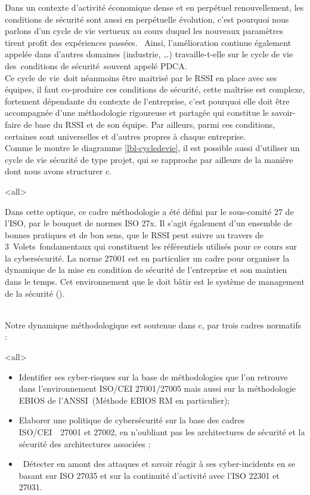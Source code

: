 Dans un contexte d'activité économique dense et en perpétuel renouvellement, les conditions de sécurité sont aussi en perpétuelle évolution, c’est pourquoi nous parlons d'un cycle de vie vertueux au cours duquel les nouveaux paramètres tirent profit des expériences passées.  Ainsi, l’amélioration continue également appelée  dans d’autres domaines (industrie, …) travaille-t-elle sur le cycle de vie des conditions de sécurité souvent appelé \gls{PDCA}.\\
Ce cycle de vie doit néanmoins être maitrisé par le RSSI en place avec ses équipes, il faut co-produire ces conditions de sécurité, cette maîtrise est complexe, fortement dépendante du contexte de l'entreprise, c’est pourquoi elle doit être accompagnée d'une méthodologie rigoureuse et partagée qui constitue le savoir-faire de base du RSSI et de son équipe. Par ailleurs, parmi ces conditions, certaines sont universelles et d’autres propres à chaque entreprise. \\ Comme le montre le diagramme \ref{lbl-cycledevie}, il est possible aussi d’utiliser un cycle de vie sécurité de type projet, qui se rapproche par ailleurs de la manière dont nous avons structurer c\edoc. 

\mode<all>{}


Dans cette optique, ce cadre méthodologie a été défini par le sous-comité 27 de l'ISO, par le bouquet de normes ISO 27x. Il s’agit également d'un ensemble de bonnes pratiques et de bon sens, que le RSSI peut suivre au travers de 3 Volets fondamentaux qui constituent les référentiels utilisés pour ce cours sur la cybersécurité. La norme 27001 est en particulier un cadre pour organiser la dynamique de la mise en condition de sécurité de l’entreprise et son maintien dans le temps. Cet environnement que le  doit bâtir est le système de management de la sécurité ().

\\
Notre dynamique méthodologique est soutenue dans  c\edoc, par trois cadres normatifs : 
 
\mode<all>{
{
\begin{itemize}
\item Identifier ses cyber-risques sur la base de méthodologies que l’on retrouve dans l’environnement ISO/CEI 27001/27005 mais aussi sur la méthodologie EBIOS de l’ANSSI (Méthode EBIOS RM en particulier); 
\item Elaborer une politique de cybersécurité sur la base des cadres ISO/CEI  27001 et 27002, en n’oubliant pas les architectures de sécurité et la sécurité des architectures associées ; 
\item Détecter en amont des attaques et savoir réagir à ses cyber-incidents en se basant sur ISO 27035 et sur la continuité d’activité avec l’ISO 22301 et 27031.
\end{itemize}
}} %


